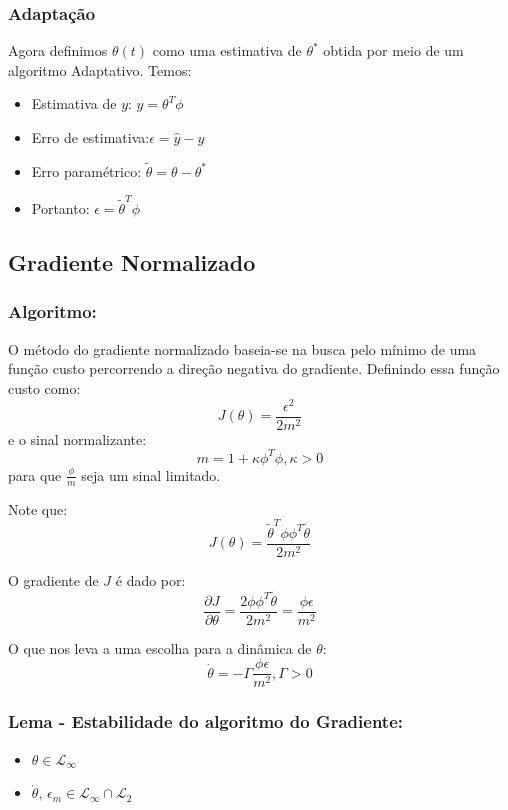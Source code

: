 \documentclass[10pt]{article}
\begin{document}
\subsubsection{Adaptação}

Agora definimos $\theta(t)$ como uma estimativa de $\theta^*$ obtida por meio de um algoritmo Adaptativo.
Temos:
\begin{itemize}
    \item Estimativa de $y$: $\hat{y} = \theta^T\phi$ 
    \item Erro de estimativa:$\epsilon = \hat{y}-y$ 
    \item Erro paramétrico: $\tilde{\theta} = \theta - \theta^*$ 
    \item Portanto: $\epsilon = \tilde{\theta}^T\phi$
\end{itemize}

\subsection{Gradiente Normalizado}

\subsubsection{Algoritmo:}

O método do gradiente normalizado baseia-se na busca pelo mínimo de uma função custo percorrendo a direção negativa do gradiente. Definindo essa função custo como: $$ J(\theta) = \frac{\epsilon^2}{2m^2} $$ e o sinal normalizante: $$m = 1+\kappa\phi^T\phi, \kappa > 0$$ para que $\frac{\phi}{m}$ seja um sinal limitado.

Note que: $$J(\theta) = \frac{\tilde{\theta}^T\phi\phi^T\tilde{\theta}}{2m^2}$$

O gradiente de $J$ é dado por: $$\frac{\partial J}{\partial \theta} = \frac{2\phi\phi^T \tilde{\theta}}{2m^2} = \frac{\phi\epsilon}{m^2}$$

O que nos leva a uma escolha para a dinâmica de $\theta$:
$$
\dot{\theta} = -\Gamma\frac{\phi\epsilon}{m^2} , \Gamma > 0
$$

\subsubsection{Lema - Estabilidade do algoritmo do Gradiente:}
\begin{itemize}
    \item $\theta \in \mathcal{L}_\infty$
    \item $\dot{\theta}, \, \epsilon_m \in \mathcal{L}_\infty \cap \mathcal{L}_2$
\end{itemize}
\end{document}
